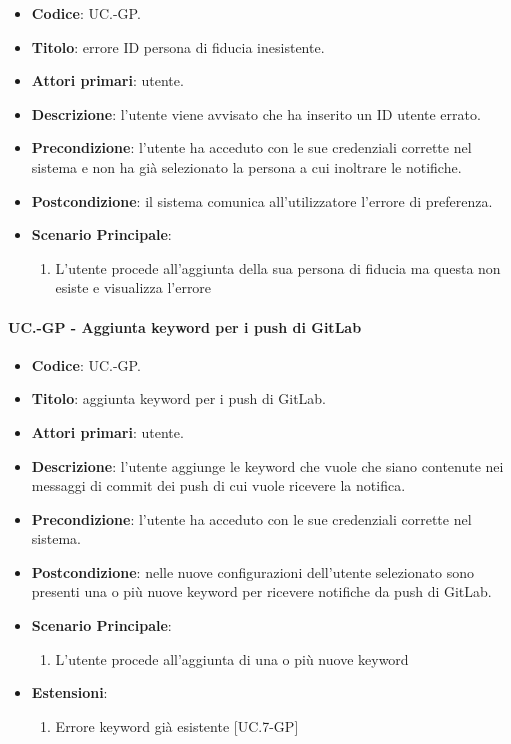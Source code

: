 		\begin{itemize}
			\item \textbf{Codice}: UC\theuccount.\thesubuccount-GP.
			\item \textbf{Titolo}: errore ID persona di fiducia inesistente.
			\item \textbf{Attori primari}: utente.
			\item \textbf{Descrizione}: l’utente viene avvisato che ha inserito un ID utente errato.
			\item \textbf{Precondizione}: l’utente ha acceduto con le sue credenziali corrette nel sistema e non ha già selezionato la persona a cui inoltrare le notifiche.
			\item \textbf{Postcondizione}: il sistema comunica all’utilizzatore l’errore di preferenza.
			\item \textbf{Scenario Principale}:
			\begin{enumerate}
				\item L'utente procede all'aggiunta della sua persona di fiducia ma questa non esiste e visualizza l'errore
			\end{enumerate}
		\end{itemize}
	
	\paragraph{UC\theuccount.\thesubuccount-GP - Aggiunta keyword per i push di GitLab}
		
		\begin{itemize}
			\item \textbf{Codice}: UC\theuccount.\thesubuccount-GP.
			\item \textbf{Titolo}: aggiunta keyword per i push di GitLab.
			\item \textbf{Attori primari}: utente.
			\item \textbf{Descrizione}: l’utente aggiunge le keyword che vuole che siano contenute nei messaggi di commit dei push di cui vuole ricevere la notifica.
			\item \textbf{Precondizione}: l’utente ha acceduto con le sue credenziali corrette nel sistema.
			\item \textbf{Postcondizione}: nelle nuove configurazioni dell'utente selezionato sono presenti una o più nuove keyword per ricevere notifiche da push di GitLab.
			\item \textbf{Scenario Principale}:
			\begin{enumerate}
				\item L'utente procede all'aggiunta di una o più nuove keyword
			\end{enumerate}
			\item \textbf{Estensioni}:
			\begin{enumerate}
				\item Errore keyword già esistente [UC\theuccount.7-GP]
			\end{enumerate}
		\end{itemize}
	
